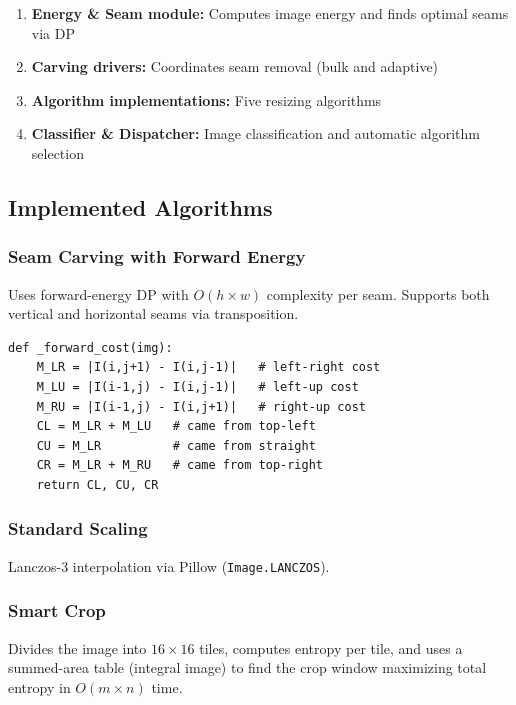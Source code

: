 \documentclass[12pt,a4paper]{article}
\begin{document}
\begin{enumerate}
    \item \textbf{Energy \& Seam module:} Computes image energy and finds optimal seams via DP
    \item \textbf{Carving drivers:} Coordinates seam removal (bulk and adaptive)
    \item \textbf{Algorithm implementations:} Five resizing algorithms
    \item \textbf{Classifier \& Dispatcher:} Image classification and automatic algorithm selection
\end{enumerate}

\subsection{Implemented Algorithms}

\subsubsection{Seam Carving with Forward Energy}

Uses forward-energy DP with $O(h \times w)$ complexity per seam. Supports both vertical and horizontal seams via transposition.

\begin{lstlisting}
def _forward_cost(img):
    M_LR = |I(i,j+1) - I(i,j-1)|   # left-right cost
    M_LU = |I(i-1,j) - I(i,j-1)|   # left-up cost
    M_RU = |I(i-1,j) - I(i,j+1)|   # right-up cost
    CL = M_LR + M_LU   # came from top-left
    CU = M_LR          # came from straight
    CR = M_LR + M_RU   # came from top-right
    return CL, CU, CR
\end{lstlisting}

\subsubsection{Standard Scaling}

Lanczos-3 interpolation via Pillow (\texttt{Image.LANCZOS}).

\subsubsection{Smart Crop}

Divides the image into $16\times 16$ tiles, computes entropy per tile, and uses a summed-area table (integral image) to find the crop window maximizing total entropy in $O(m \times n)$ time.
\end{document}
